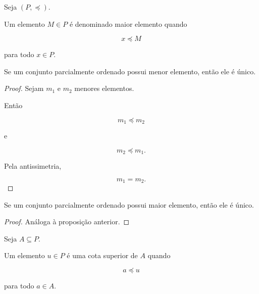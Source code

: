 \documentclass[../../main]{subfiles}
\begin{document}
\begin{defn}
	\label{def:matematica:relacoes:diagramas-de-hasse:maior-elemento}

	Seja \((P,\preceq)\).

	Um elemento \(M\in P\) é denominado maior elemento quando

	\[
		x \preceq M
	\]

	para todo \(x\in P\).

\end{defn}

\begin{prop}
	\label{prop:matematica:relacoes:diagramas-de-hasse:menor-unico}

	Se um conjunto parcialmente ordenado possui menor elemento, então ele
	é único.

\end{prop}

\begin{proof}

	Sejam \(m_1\) e \(m_2\) menores elementos.

	Então

	\[
		m_1\preceq m_2
	\]

	e

	\[
		m_2\preceq m_1.
	\]

	Pela antissimetria,

	\[
		m_1=m_2.
	\]

\end{proof}

\begin{prop}
	\label{prop:matematica:relacoes:diagramas-de-hasse:maior-unico}

	Se um conjunto parcialmente ordenado possui maior elemento, então ele
	é único.

\end{prop}

\begin{proof}

	Análoga à proposição anterior.

\end{proof}

\begin{defn}
	\label{def:matematica:relacoes:diagramas-de-hasse:cota-superior}

	Seja \(A\subseteq P\).

	Um elemento \(u\in P\) é uma cota superior de \(A\) quando

	\[
		a\preceq u
	\]

	para todo \(a\in A\).

\end{defn}
\end{document}
